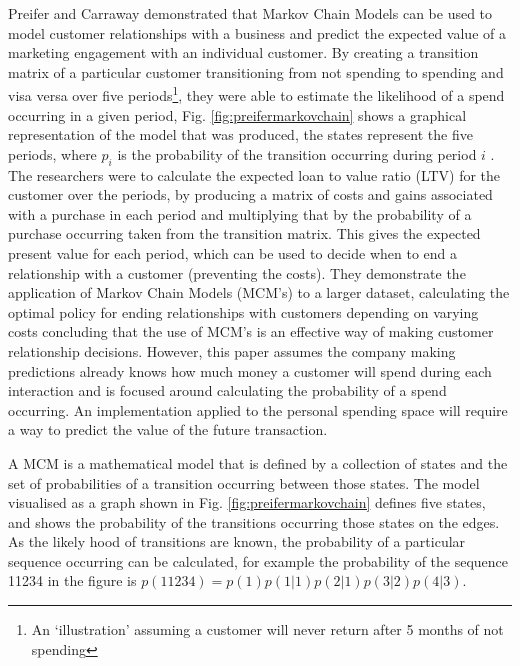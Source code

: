 Preifer and Carraway demonstrated that Markov Chain Models can be used to model customer relationships with a business and predict the expected value of a marketing engagement with an individual customer. By creating a transition matrix of a particular customer transitioning from not spending to spending and visa versa over five periods\footnote{An `illustration' assuming a customer will never return after 5 months of not spending}, they were able to estimate the likelihood of a spend occurring in a given period, Fig. \ref{fig:preifermarkovchain} shows a graphical representation of the model that was produced, the states represent the five periods, where $p_{i}$ is the probability of the transition occurring during period $i$ \cite{pfeifer2000modeling}.
% 
The researchers were to calculate the expected loan to value ratio (LTV) for the customer over the periods, by producing a matrix of costs and gains associated with a purchase in each period and multiplying that by the probability of a purchase occurring taken from the transition matrix. This gives the expected present value for each period, which can be used to decide when to end a relationship with a customer (preventing the costs).
%
They demonstrate the application of Markov Chain Models (MCM's) to a larger dataset, calculating the optimal policy for ending relationships with customers depending on varying costs concluding that the use of MCM's is an effective way of making customer relationship decisions. However, this paper assumes the company making predictions already knows how much money a customer will spend during each interaction and is focused around calculating the probability of a spend occurring. An implementation applied to the personal spending space will require a way to predict the value of the future transaction.

A MCM is a mathematical model that is defined by a collection of states and the set of probabilities of a transition occurring between those states. The model visualised as a graph shown in Fig. \ref{fig:preifermarkovchain} defines five states, and shows the probability of the transitions occurring those states on the edges. As the likely hood of transitions are known, the probability of a particular sequence occurring can be calculated, for example the probability of the sequence 11234 in the figure is $p(11234) = p(1)p(1|1)p(2|1)p(3|2)p(4|3)$. 

